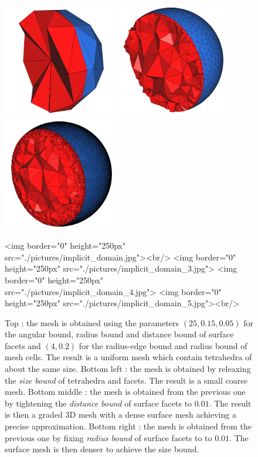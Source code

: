 \begin{figure}[ht]
\begin{center}
\begin{ccTexOnly}
   \includegraphics[height=5cm]{Mesh_3/pictures/implicit_domain_3}
   \includegraphics[height=5cm]{Mesh_3/pictures/implicit_domain_4}
   \includegraphics[height=5cm]{Mesh_3/pictures/implicit_domain_5}
 \end{ccTexOnly}
 \begin{ccHtmlOnly}
   <img border="0" height="250px" src="./pictures/implicit_domain.jpg"><br/>
   <img border="0" height="250px" src="./pictures/implicit_domain_3.jpg">
   <img border="0" height="250px" src="./pictures/implicit_domain_4.jpg">
   <img border="0" height="250px" src="./pictures/implicit_domain_5.jpg"><br/>
 \end{ccHtmlOnly}
 \caption{Top : the mesh  is obtained using the parameters $(25,0.15,0.05)$ for the angular bound,
radius bound and distance bound of  surface facets
and 
$(4,0.2)$ for  the radius-edge bound and radius  bound of mesh cells. The result is a  uniform mesh which contain tetrahedra
of about the same size. 
Bottom  left :
the mesh  is obtained by releaxing the \emph{ size bound} of tetrahedra
and facets.
 The result is a small coarse mesh. 
Bottom middle : the mesh  is obtained from the previous one  by tightening the \emph{distance bound} 
of surface facets to
$0.01$. The result is then a graded 3D mesh with a dense surface mesh
achieving a precise approximation. 
Bottom right :
the mesh  is obtained from the previous one  by fixing \emph{radius bound} of surface facets to
to $0.01$. The surface mesh is then denser to achieve the size bound.}
  \label{figure:parameters}
\end{center}
\end{figure}



